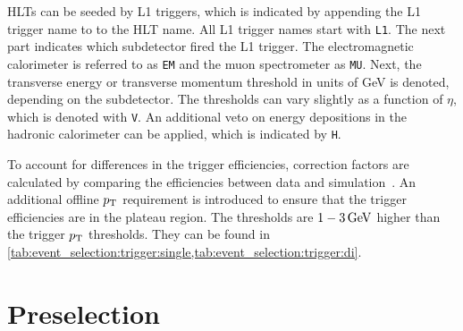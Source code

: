 HLTs can be seeded by L1 triggers, which is indicated by appending the L1 trigger name to to the HLT name.
All L1 trigger names start with \texttt{L1}.
The next part indicates which subdetector fired the L1 trigger.
The electromagnetic calorimeter is referred to as \texttt{EM} and the muon spectrometer as \texttt{MU}.
Next, the transverse energy or transverse momentum threshold in units of GeV is denoted, depending on the subdetector.
The \et{} thresholds can vary slightly as a function of $\eta$, which is denoted with \texttt{V}.
An additional veto on energy depositions in the hadronic calorimeter can be applied, which is indicated by \texttt{H}.

To account for differences in the trigger efficiencies, correction factors are calculated by comparing
the efficiencies between data and simulation~\cite{Trigger2015,Trigger2016}.
An additional offline $p_\text{T}$ requirement is introduced to ensure that the trigger efficiencies are in the plateau region.
The thresholds are $\unit[1-3]{GeV}$ higher than the trigger $p_\text{T}$ thresholds.
They can be found in \cref{tab:event_selection:trigger:single,tab:event_selection:trigger:di}.

\section{Preselection}\label{sec:event_selection:preselection}


